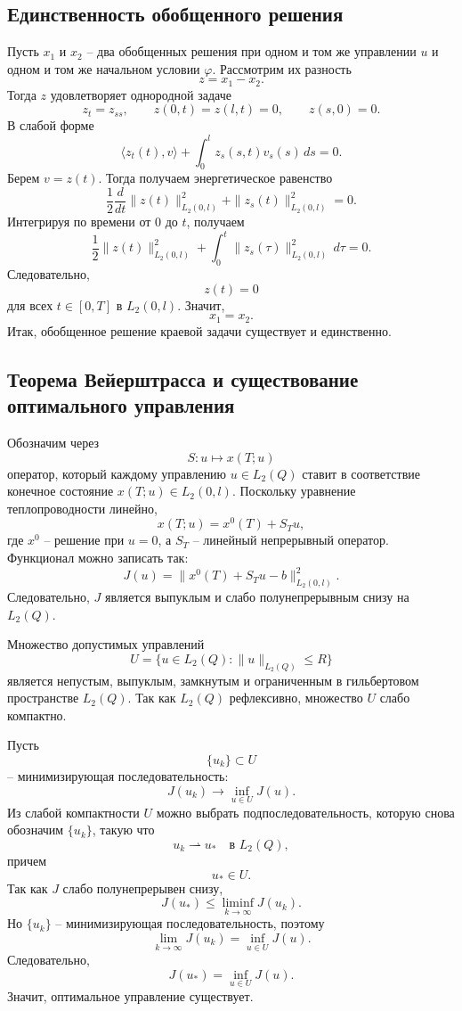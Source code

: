 \documentclass[12pt,a4paper]{article}
\begin{document}
\subsection*{Единственность обобщенного решения}
Пусть \(x_1\) и \(x_2\) -- два обобщенных решения при одном и том же управлении \(u\) и одном и том же начальном условии \(\varphi\). Рассмотрим их разность
\[
z=x_1-x_2.
\]
Тогда \(z\) удовлетворяет однородной задаче
\[
z_t=z_{ss},
\qquad z(0,t)=z(l,t)=0,
\qquad z(s,0)=0.
\]
В слабой форме
\[
\langle z_t(t),v\rangle+
\int_0^l z_s(s,t)v_s(s)\,ds=0.
\]
Берем \(v=z(t)\). Тогда получаем энергетическое равенство
\[
\frac12\frac{d}{dt}\|z(t)\|_{L_2(0,l)}^2+
\|z_s(t)\|_{L_2(0,l)}^2=0.
\]
Интегрируя по времени от \(0\) до \(t\), получаем
\[
\frac12\|z(t)\|_{L_2(0,l)}^2+
\int_0^t\|z_s(\tau)\|_{L_2(0,l)}^2\,d\tau=0.
\]
Следовательно,
\[
z(t)=0
\]
для всех \(t\in[0,T]\) в \(L_2(0,l)\). Значит,
\[
x_1=x_2.
\]
Итак, обобщенное решение краевой задачи существует и единственно.

\subsection*{Теорема Вейерштрасса и существование оптимального управления}
Обозначим через
\[
S:u\mapsto x(T;u)
\]
оператор, который каждому управлению \(u\in L_2(Q)\) ставит в соответствие конечное состояние \(x(T;u)\in L_2(0,l)\). Поскольку уравнение теплопроводности линейно,
\[
x(T;u)=x^0(T)+S_Tu,
\]
где \(x^0\) -- решение при \(u=0\), а \(S_T\) -- линейный непрерывный оператор. Функционал можно записать так:
\[
J(u)=\|x^0(T)+S_Tu-b\|_{L_2(0,l)}^2.
\]
Следовательно, \(J\) является выпуклым и слабо полунепрерывным снизу на \(L_2(Q)\).

Множество допустимых управлений
\[
U=\{u\in L_2(Q):\|u\|_{L_2(Q)}\le R\}
\]
является непустым, выпуклым, замкнутым и ограниченным в гильбертовом пространстве \(L_2(Q)\). Так как \(L_2(Q)\) рефлексивно, множество \(U\) слабо компактно.

Пусть
\[
\{u_k\}\subset U
\]
-- минимизирующая последовательность:
\[
J(u_k)\to \inf_{u\in U}J(u).
\]
Из слабой компактности \(U\) можно выбрать подпоследовательность, которую снова обозначим \(\{u_k\}\), такую что
\[
u_k\rightharpoonup u_*
\quad \text{в }L_2(Q),
\]
причем
\[
u_*\in U.
\]
Так как \(J\) слабо полунепрерывен снизу,
\[
J(u_*)\le \liminf_{k\to\infty}J(u_k).
\]
Но \(\{u_k\}\) -- минимизирующая последовательность, поэтому
\[
\lim_{k\to\infty}J(u_k)=\inf_{u\in U}J(u).
\]
Следовательно,
\[
J(u_*)=\inf_{u\in U}J(u).
\]
Значит, оптимальное управление существует.
\end{document}
